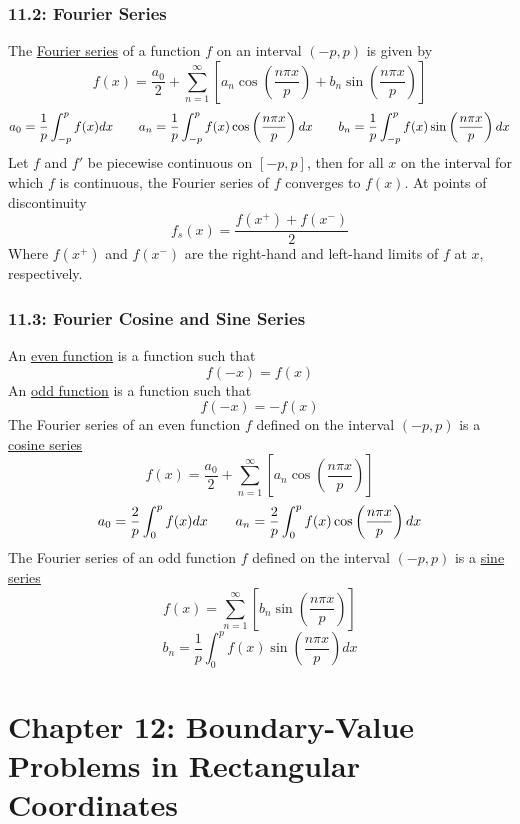 \documentclass{article}
\begin{document}
\section*{11.2: Fourier Series}
The \underline{Fourier series} of a function \(f\) on an interval \((-p, p)\) is given by
\[f(x)=\frac{a_0}{2}+\sum_{n=1}^\infty\left[a_n\cos\left(\frac{n\pi x}{p}\right)+b_n\sin\left(\frac{n\pi x}{p}\right)\right]\]
\[a_0=\frac{1}{p}\int_{-p}^pf(x)dx\hspace{7 mm}a_n=\frac{1}{p}\int_{-p}^pf(x)\cos\left(\frac{n\pi x}{p}\right)dx\hspace{7 mm}b_n=\frac{1}{p}\int_{-p}^pf(x)\sin\left(\frac{n\pi x}{p}\right)dx\]
Let \(f\) and \(f'\) be piecewise continuous on \([-p, p]\), then for all \(x\) on the interval for which \(f\) is continuous, the Fourier series of \(f\) converges to \(f(x)\). At points of discontinuity
\[f_s(x)=\frac{f(x^+)+f(x^-)}{2}\]
Where \(f(x^+)\) and \(f(x^-)\) are the right-hand and left-hand limits of \(f\) at \(x\), respectively.
\section*{11.3: Fourier Cosine and Sine Series}
An \underline{even function} is a function such that
\[f(-x)=f(x)\]
An \underline{odd function} is a function such that
\[f(-x)=-f(x)\]
The Fourier series of an even function \(f\) defined on the interval \((-p, p)\) is a \underline{cosine series}
\[f(x)=\frac{a_0}{2}+\sum_{n=1}^\infty\left[a_n\cos\left(\frac{n\pi x}{p}\right)\right]\]
\[a_0=\frac{2}{p}\int_{0}^pf(x)dx\hspace{7 mm}a_n=\frac{2}{p}\int_{0}^pf(x)\cos\left(\frac{n\pi x}{p}\right)dx\]
The Fourier series of an odd function \(f\) defined on the interval \((-p, p)\) is a \underline{sine series}
\[f(x)=\sum_{n=1}^\infty\left[b_n\sin\left(\frac{n\pi x}{p}\right)\right]\]
\[b_n=\frac{1}{p}\int_{0}^pf(x)\sin\left(\frac{n\pi x}{p}\right)dx\]
\part*{Chapter 12: Boundary-Value Problems in Rectangular Coordinates}
\end{document}
